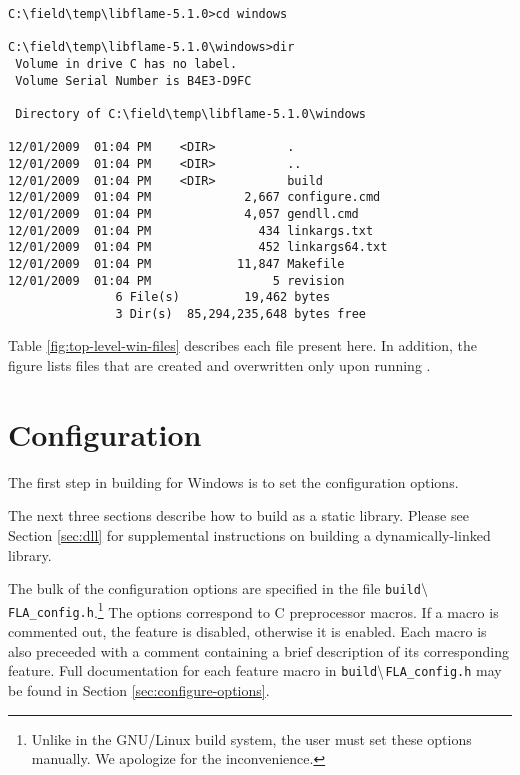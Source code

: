 \begin{Verbatim}[frame=single,framesep=2.5mm,xleftmargin=5mm,fontsize=\footnotesize]
C:\field\temp\libflame-5.1.0>cd windows

C:\field\temp\libflame-5.1.0\windows>dir
 Volume in drive C has no label.
 Volume Serial Number is B4E3-D9FC

 Directory of C:\field\temp\libflame-5.1.0\windows

12/01/2009  01:04 PM    <DIR>          .
12/01/2009  01:04 PM    <DIR>          ..
12/01/2009  01:04 PM    <DIR>          build
12/01/2009  01:04 PM             2,667 configure.cmd
12/01/2009  01:04 PM             4,057 gendll.cmd
12/01/2009  01:04 PM               434 linkargs.txt
12/01/2009  01:04 PM               452 linkargs64.txt
12/01/2009  01:04 PM            11,847 Makefile
12/01/2009  01:04 PM                 5 revision
               6 File(s)         19,462 bytes
               3 Dir(s)  85,294,235,648 bytes free
\end{Verbatim}

\noindent
Table \ref{fig:top-level-win-files} describes each file present here.
In addition, the figure lists files that are created and overwritten
only upon running \configurecmdns.



\section{Configuration}
\label{sec:configuration-win}


The first step in building \libflame for Windows is to set the configuration
options.

The next three sections describe how to build \libflame as a static
library.
Please see Section \ref{sec:dll} for supplemental instructions on building a
dynamically-linked library.

The bulk of the configuration options are specified in the file
{\tt build$\backslash$FLA\_config.h}.\footnote{Unlike in the GNU/Linux build system,
the user must set these options manually. We apologize for the inconvenience.}
The options correspond to C preprocessor macros.
If a macro is commented out, the feature is disabled, otherwise it is enabled.
Each macro is also preceeded with a comment containing a brief description of
its corresponding feature.
Full documentation for each feature macro in {\tt build$\backslash$FLA\_config.h}
may be found in Section \ref{sec:configure-options}.

